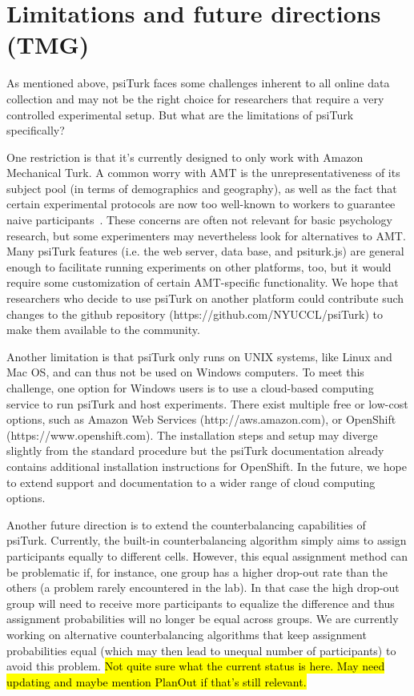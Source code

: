 \documentclass[twocolumn]{svjour3}          %
\begin{document}
\section{Limitations and future directions (TMG)}

As mentioned above, psiTurk faces some challenges inherent to all online data collection and may not be the right choice for
researchers that require a very controlled experimental setup. But what are the limitations of psiTurk specifically?

One restriction is that it's currently designed to only work with Amazon Mechanical Turk. A common worry with AMT is the unrepresentativeness of
its subject pool (in terms of demographics and geography), as well as the fact that certain experimental protocols are now too well-known 
to workers to guarantee naive
participants~\citep{chandler2014nonnaivete}. These concerns are often not relevant for basic psychology research, but some experimenters may nevertheless
look for alternatives to AMT. Many psiTurk features (i.e. the web server, data base, and psiturk.js) are general
enough to facilitate running experiments on other platforms, too, but it would require some customization of certain AMT-specific functionality. 
We hope that researchers who decide
to use psiTurk on another platform could contribute such changes to the github repository (https://github.com/NYUCCL/psiTurk) to make them
available to the community.


Another limitation is that psiTurk only runs on UNIX systems, like Linux and Mac OS, and can thus not be used on Windows computers. To meet this 
challenge, one option for Windows users is to use a cloud-based computing service to run psiTurk and host experiments. There exist
multiple free or low-cost options, such as Amazon Web Services (http://aws.amazon.com), or OpenShift (https://www.openshift.com). 
The installation steps and setup may diverge slightly from the standard procedure but 
 the psiTurk documentation already contains additional installation instructions for OpenShift. In the future, we hope to extend support  and 
documentation to a wider range of cloud computing options.

Another future direction is to extend the counterbalancing capabilities of psiTurk. Currently, the built-in counterbalancing algorithm
simply aims to assign participants equally to different cells.  However, this equal assignment method can be problematic if, for instance, 
one group has a higher drop-out rate than the others (a problem rarely encountered in the lab). 
In that case the high drop-out group will need to receive
more participants to equalize the difference and thus assignment probabilities will no longer be equal across groups. We are
currently working on alternative counterbalancing algorithms that keep assignment probabilities equal (which may then lead to unequal
number of participants) to avoid this problem. \hl{Not quite sure what the current status is here. May need updating and maybe mention PlanOut
if that's still relevant.}
\end{document}

